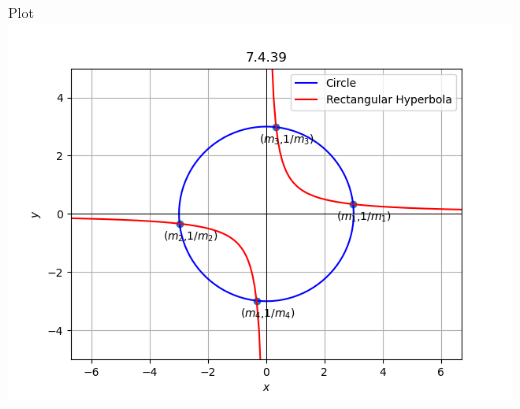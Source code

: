 \documentclass{beamer}
\begin{document}
 \begin{frame}{Plot}
    \centering
    \includegraphics[width=\columnwidth, height=0.8\textheight, keepaspectratio]{../figs/graph1.png}   
\end{frame}
\end{document}
